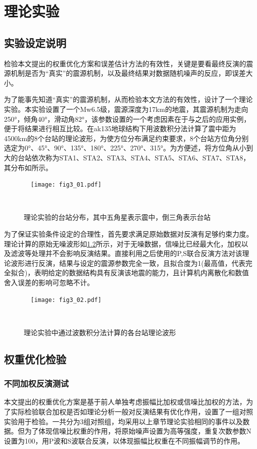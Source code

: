 

\chapter{理论实验}

\section{实验设定说明}
检验本文提出的权重优化方案和误差估计方法的有效性，关键是要看最终反演的震源机制是否为“真实”的震源机制，以及最终结果对数据随机噪声的反应，即误差大小。

为了能事先知道“真实”的震源机制，从而检验本文方法的有效性，设计了一个理论实验。本实验设置了一个Mw6.5级，震源深度为17km的地震，其震源机制为走向250°，倾角40°，滑动角82°，该参数设置的一个考虑因素在于与之后的应用实例，便于将结果进行相互比较。在ak135地球结构\citep{Kennett1995}下用波数积分法计算了震中距为4500km的8个台站的理论波形，为使方位分布满足约束要求，8个台站方位角分别选定为0°、45°、90°、135°、180°、225°、270°、315°。为方便述，将方位角从小到大的台站依次称为STA1、STA2、STA3、STA4、STA5、STA6、STA7、STA8，其分布如所示。
\begin{figure}
\centering
  \texttt{[image: fig3\_01.pdf]}
  \caption{理论实验的台站分布，其中五角星表示震中，倒三角表示台站}
  \label{fig3_01}
\end{figure}

为了保证实验条件设定的合理性，首先要求满足原始数据对反演有足够约束力度。理论计算的原始无噪波形如\ref{fig3_02}所示，对于无噪数据，信噪比已经最大化，加权以及滤波等处理并不会影响反演结果。直接利用之后使用的P,S联合反演方法对该理论波形进行反演，结果与设定的震源参数完全一致，且拟合度为1(最高值，代表完全拟合)，表明给定的数据结构具有反演该地震的能力，且计算机内离散化和数值舍入误差的影响可忽略不计。
\begin{figure}
\centering
  \texttt{[image: fig3\_02.pdf]}
  \caption{理论实验中通过波数积分法计算的各台站理论波形}
  \label{fig3_02}
\end{figure}

\section{权重优化检验}

\subsection{不同加权反演测试}
本文提出的权重优化方案是基于前人单独考虑振幅比加权或信噪比加权的方法，为了实际检验联合加权是否如理论分析一般对反演结果有优化作用，设置了一组对照实验用于检验。一共分为3组对照组，均采用以上章节理论实验相同的事件以及数据。但为了体现信噪比权重的作用，将原始噪声设置为高等强度，重复次数参数N设置为100，用P波和S波联合反演，以体现振幅比权重在不同振幅调节的作用。

